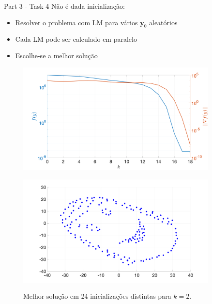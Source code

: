 \documentclass{beamer}					%
\begin{document}
\begin{frame}{Part 3 - Task 4}
	Não é dada inicialização:
	\begin{itemize}
		\item Resolver o problema com LM para vários $\mathbf{y}_0$ aleatórios
		\item Cada LM pode ser calculado em paralelo
		\item Escolhe-se a melhor solução 
	\end{itemize}
\begin{figure}[ht]
	\centering
	\begin{minipage}[b]{0.5\textwidth}
		\centering
		\includegraphics[width=0.9\textwidth]{figures/task4_LM.png}
		\label{fig:task4_LM}
	\end{minipage}%
	\hfill
	\begin{minipage}[b]{0.5\textwidth}
		\centering
		\includegraphics[width=0.9\textwidth]{figures/task4_sol.png}
		\label{fig:task4_sol}
	\end{minipage}%
	\caption{Melhor solução em 24 inicializações distintas para $k=2$.}
\end{figure}
	 
\end{frame}
\end{document}
